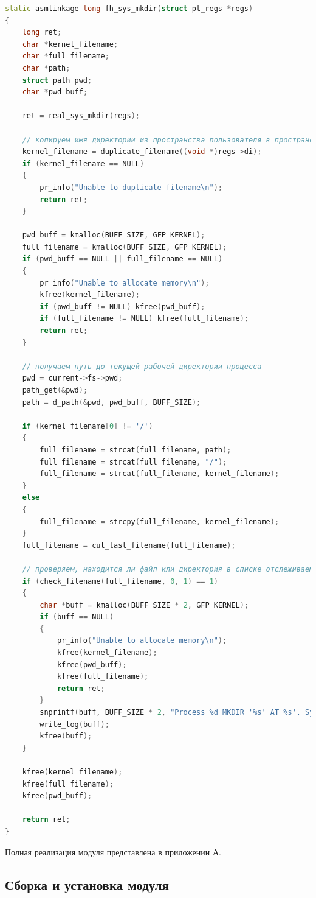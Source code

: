 \documentclass[a4paper,14pt]{article}
\begin{document}
\begin{lstlisting}[language=C++,label={lst:mke}, caption=\text{Созданный обработчик системного вызова mkdir.}]
static asmlinkage long fh_sys_mkdir(struct pt_regs *regs)
{
	long ret;
	char *kernel_filename;
	char *full_filename;
	char *path;
	struct path pwd;
	char *pwd_buff;

	ret = real_sys_mkdir(regs);

	// копируем имя директории из пространства пользователя в пространство ядра
	kernel_filename = duplicate_filename((void *)regs->di);
	if (kernel_filename == NULL)
	{
		pr_info("Unable to duplicate filename\n");
		return ret;
	}

	pwd_buff = kmalloc(BUFF_SIZE, GFP_KERNEL);
	full_filename = kmalloc(BUFF_SIZE, GFP_KERNEL);
	if (pwd_buff == NULL || full_filename == NULL)
	{
		pr_info("Unable to allocate memory\n");
		kfree(kernel_filename);
		if (pwd_buff != NULL) kfree(pwd_buff);
		if (full_filename != NULL) kfree(full_filename);
		return ret;
	}
	
	// получаем путь до текущей рабочей директории процесса
	pwd = current->fs->pwd;
	path_get(&pwd);
	path = d_path(&pwd, pwd_buff, BUFF_SIZE);

	if (kernel_filename[0] != '/')
	{
		full_filename = strcat(full_filename, path);
		full_filename = strcat(full_filename, "/");
		full_filename = strcat(full_filename, kernel_filename);
	}
	else
	{
		full_filename = strcpy(full_filename, kernel_filename);
	}
	full_filename = cut_last_filename(full_filename);

	// проверяем, находится ли файл или директория в списке отслеживаемых
	if (check_filename(full_filename, 0, 1) == 1)
	{
		char *buff = kmalloc(BUFF_SIZE * 2, GFP_KERNEL);
		if (buff == NULL)
		{
			pr_info("Unable to allocate memory\n");
			kfree(kernel_filename);
			kfree(pwd_buff);
			kfree(full_filename);
			return ret;
		}
		snprintf(buff, BUFF_SIZE * 2, "Process %d MKDIR '%s' AT %s'. Syscall returned %ld\n", current->pid, kernel_filename, full_filename, ret);
		write_log(buff);
		kfree(buff);
	}

	kfree(kernel_filename);
	kfree(full_filename);
	kfree(pwd_buff);

	return ret;
}
\end{lstlisting}

Полная реализация модуля представлена в приложении А.

\subsection{Сборка и установка модуля}
\end{document}
